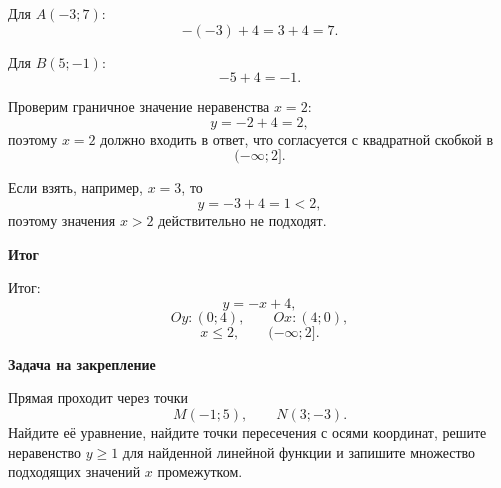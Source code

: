 \documentclass[12pt,a4paper]{article}
\newcommand{\reviewhead}[1]{%
  \par\medskip
  \noindent\textbf{#1}\par\smallskip
}
\begin{document}
Для \(A(-3;7)\):
\[
-(-3)+4=3+4=7.
\]

Для \(B(5;-1)\):
\[
-5+4=-1.
\]

Проверим граничное значение неравенства \(x=2\):
\[
y=-2+4=2,
\]
поэтому \(x=2\) должно входить в ответ, что согласуется с квадратной скобкой в
\[
(-\infty;2].
\]

Если взять, например, \(x=3\), то
\[
y=-3+4=1<2,
\]
поэтому значения \(x>2\) действительно не подходят.

\reviewhead{Итог}
\textcolor{teal!60!black}{Итог:}
\[
y=-x+4,
\]
\[
Oy:(0;4),\qquad Ox:(4;0),
\]
\[
x\le 2,\qquad (-\infty;2].
\]

\reviewhead{Задача на закрепление}
Прямая проходит через точки
\[
M(-1;5),\qquad N(3;-3).
\]
Найдите её уравнение, найдите точки пересечения с осями координат, решите неравенство \(y\ge 1\) для найденной линейной функции и запишите множество подходящих значений \(x\) промежутком.
\end{document}
